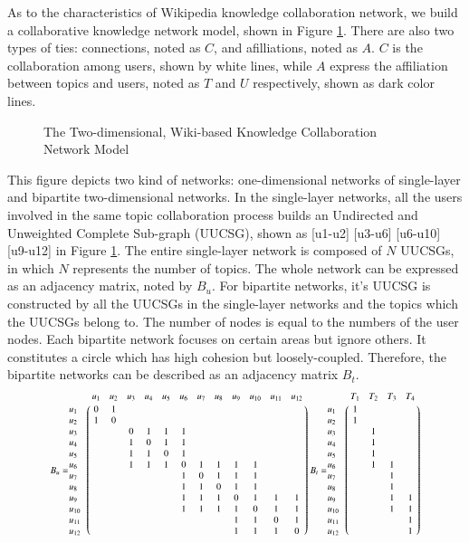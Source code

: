 \documentclass{elsarticle}
\begin{document}
As to the characteristics of Wikipedia knowledge collaboration
network, we build a collaborative 
knowledge network model, shown in Figure \ref{fig:two-layer}. There are also two
types of ties: connections, noted as $C$, and afilliations, noted as $A$. $C$
is the collaboration among users, shown by white lines, while
$A$ express the affiliation between topics and users, noted as $T$ and $U$ respectively, shown as dark color lines. 

\begin{figure}[h]
  
  \centering
  \scalebox{0.8}{\texttt{[image: 01]}}
  \caption{The Two-dimensional, Wiki-based Knowledge Collaboration Network Model}
  \label{fig:two-layer}
\end{figure}

This figure depicts  two kind of  networks: one-dimensional networks of
single-layer and bipartite two-dimensional networks. 
In the single-layer networks, all the users involved in the same topic
collaboration process builds an Undirected and Unweighted Complete
Sub-graph (UUCSG), shown as [u1-u2] [u3-u6] [u6-u10] [u9-u12] in
Figure \ref{fig:two-layer}. The entire single-layer network is composed of $N$ UUCSGs, in
which $N$ represents the number of topics. The whole network can be
expressed as an adjacency matrix, noted by $B_u$.
For bipartite networks, it's UUCSG is constructed by all the UUCSGs in
 the single-layer networks and the topics which the UUCSGs belong
 to. The number of nodes is equal to the numbers of the user
 nodes. Each bipartite network focuses on  certain areas but ignore
 others. It  constitutes a circle which has high
 cohesion but loosely-coupled. Therefore, the bipartite networks can be described as an
 adjacency matrix $B_t$. 
\begin{displaymath}
\scalebox{0.73}{
$
  B_u = \bordermatrix{%
    &u_1&u_2&u_3&u_4&u_5&u_6&u_7&u_8&u_9&u_{10}&u_{11}&u_{12} \cr
  u_1&0&1 \cr
  u_2&1&0 \cr
  u_3&&&0&1&1&1 \cr
   u_4&&&1&0&1&1 \cr
 u_5&&&1&1&0&1 \cr
 u_6&&&1&1&1&0&1&1&1&1 \cr
 u_7&&&&&&1&0&1&1&1 \cr
 u_8&&&&&&1&1&0&1&1 \cr
u_9&&&&&&1&1&1&0&1&1&1 \cr
  u_{10}&&&&&&1&1&1&1&0&1&1 \cr
   u_{11}&&&&&&&&&1&1&0&1 \cr
  u_{12}&&&&&&&&&1&1&1&0 \cr
}
$

$
   B_t = \bordermatrix{%
    &T_1&T_2&T_3&T_4 \cr
   u_1&1 \cr
   u_2&1 \cr
    u_3&&1 \cr
    u_4&&1 \cr
    u_5&&1 \cr
    u_6&&1&1 \cr
    u_7&&&1 \cr
    u_8&&&1 \cr
    u_9&&&1&1 \cr
    u_{10}&&&1&1 \cr
    u_{11}&&&&1 \cr
    u_{12}&&&&1 \cr
}
$
}
\end{displaymath}
\end{document}
